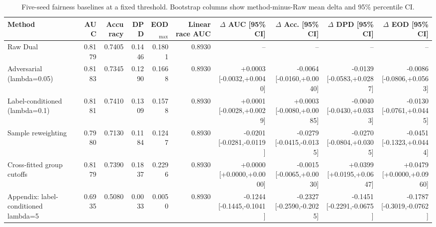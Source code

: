\begin{table}[htbp]
\centering
\small
\caption{Five-seed fairness baselines at a fixed threshold. Bootstrap columns show method-minus-Raw mean delta and 95\% percentile CI.}
\label{tab:baselines-v2}
\begin{tabular}{lrrrrrrrrr}
\toprule
Method & AUC & Accuracy & DPD & EOD$_{\max}$ & Linear race AUC & $\Delta$ AUC [95\% CI] & $\Delta$ Acc. [95\% CI] & $\Delta$ DPD [95\% CI] & $\Delta$ EOD [95\% CI] \\
\midrule
Raw Dual & 0.8179 & 0.7405 & 0.1446 & 0.1801 & 0.8930 & -- & -- & -- & -- \\
Adversarial (lambda=0.05) & 0.8183 & 0.7345 & 0.1290 & 0.1668 & 0.8930 & +0.0003 [-0.0032,+0.0040] & -0.0064 [-0.0160,+0.0040] & -0.0139 [-0.0583,+0.0287] & -0.0086 [-0.0806,+0.0563] \\
Label-conditioned (lambda=0.1) & 0.8181 & 0.7410 & 0.1309 & 0.1578 & 0.8930 & +0.0001 [-0.0028,+0.0029] & +0.0003 [-0.0080,+0.0085] & -0.0040 [-0.0430,+0.0333] & -0.0130 [-0.0761,+0.0445] \\
Sample reweighting & 0.7980 & 0.7130 & 0.1184 & 0.1247 & 0.8930 & -0.0201 [-0.0281,-0.0119] & -0.0279 [-0.0415,-0.0135] & -0.0270 [-0.0804,+0.0305] & -0.0451 [-0.1323,+0.0444] \\
Cross-fitted group cutoffs & 0.8179 & 0.7390 & 0.1837 & 0.2296 & 0.8930 & +0.0000 [+0.0000,+0.0000] & -0.0015 [-0.0065,+0.0030] & +0.0399 [+0.0195,+0.0647] & +0.0479 [+0.0000,+0.0960] \\
Appendix: label-conditioned lambda=5 & 0.6935 & 0.5080 & 0.0033 & 0.0050 & 0.8930 & -0.1244 [-0.1445,-0.1041] & -0.2327 [-0.2590,-0.2025] & -0.1451 [-0.2291,-0.0675] & -0.1787 [-0.3019,-0.0762] \\
\bottomrule
\end{tabular}
\end{table}
